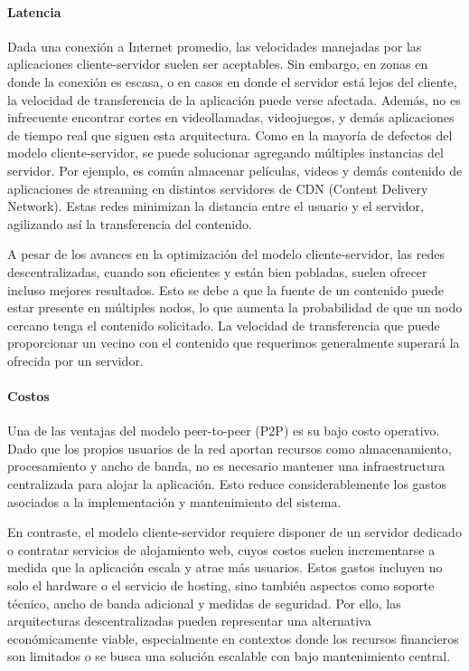 \paragraph{Latencia}
Dada una conexión a Internet promedio, las velocidades manejadas por las aplicaciones cliente-servidor suelen ser aceptables. Sin embargo, en zonas en donde la conexión es escasa, o en casos en donde el servidor está lejos del cliente, la velocidad de transferencia de la aplicación puede verse afectada. Además, no es infrecuente encontrar cortes en videollamadas, videojuegos, y demás aplicaciones de tiempo real que siguen esta arquitectura. Como en la mayoría de defectos del modelo cliente-servidor, se puede solucionar agregando múltiples instancias del servidor. Por ejemplo, es común almacenar  películas, videos y demás contenido de aplicaciones de streaming en distintos servidores de CDN (Content Delivery Network). Estas redes minimizan la distancia entre el usuario y el servidor, agilizando así la transferencia del contenido.

A pesar de los avances en la optimización del modelo cliente-servidor, las redes descentralizadas, cuando son eficientes y están bien pobladas, suelen ofrecer incluso mejores resultados. Esto se debe a que la fuente de un contenido puede estar presente en múltiples nodos, lo que aumenta la probabilidad de que un nodo cercano tenga el contenido solicitado. La velocidad de transferencia que puede proporcionar un vecino con el contenido que requerimos generalmente superará la ofrecida por un servidor.

\paragraph{Costos}

Una de las ventajas del modelo peer-to-peer (P2P) es su bajo costo operativo. Dado que los propios usuarios de la red aportan recursos como almacenamiento, procesamiento y ancho de banda, no es necesario mantener una infraestructura centralizada para alojar la aplicación. Esto reduce considerablemente los gastos asociados a la implementación y mantenimiento del sistema.

En contraste, el modelo cliente-servidor requiere disponer de un servidor dedicado o contratar servicios de alojamiento web, cuyos costos suelen incrementarse a medida que la aplicación escala y atrae más usuarios. Estos gastos incluyen no solo el hardware o el servicio de hosting, sino también aspectos como soporte técnico, ancho de banda adicional y medidas de seguridad. Por ello, las arquitecturas descentralizadas pueden representar una alternativa económicamente viable, especialmente en contextos donde los recursos financieros son limitados o se busca una solución escalable con bajo mantenimiento central.

